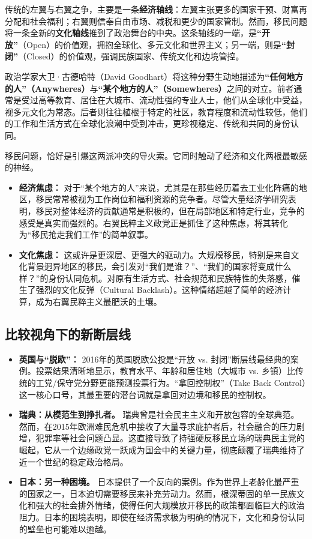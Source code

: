 \documentclass[a5paper, 11pt, openany]{ctexbook}
\begin{document}
传统的左翼与右翼之争，主要是一条\textbf{经济轴线}：左翼主张更多的国家干预、财富再分配和社会福利；右翼则信奉自由市场、减税和更少的国家管制。然而，移民问题将一条全新的\textbf{文化轴线}推到了政治舞台的中央。这条轴线的一端，是\textbf{“开放”}（Open）的价值观，拥抱全球化、多元文化和世界主义；另一端，则是\textbf{“封闭”}（Closed）的价值观，强调民族国家、传统文化和边境管控。

政治学家大卫·古德哈特（David Goodhart）将这种分野生动地描述为\textbf{“任何地方的人”（Anywheres）}与\textbf{“某个地方的人”（Somewheres）}之间的对立。前者通常是受过高等教育、居住在大城市、流动性强的专业人士，他们从全球化中受益，视多元文化为常态。后者则往往植根于特定的社区，教育程度和流动性较低，他们的工作和生活方式在全球化浪潮中受到冲击，更珍视稳定、传统和共同的身份认同。

移民问题，恰好是引爆这两派冲突的导火索。它同时触动了经济和文化两根最敏感的神经。

\begin{itemize}
    \item \textbf{经济焦虑：} 对于“某个地方的人”来说，尤其是在那些经历着去工业化阵痛的地区，移民常常被视为工作岗位和福利资源的竞争者。尽管大量经济学研究表明，移民对整体经济的贡献通常是积极的，但在局部地区和特定行业，竞争的感受是真实而强烈的。右翼民粹主义政党正是抓住了这种焦虑，将其转化为“移民抢走我们工作”的简单叙事。
    \item \textbf{文化焦虑：} 这或许是更深层、更强大的驱动力。大规模移民，特别是来自文化背景迥异地区的移民，会引发对“我们是谁？”、“我们的国家将变成什么样？”的身份认同危机。对原有生活方式、社会规范和民族特性的失落感，催生了强烈的文化反弹（Cultural Backlash）。这种情绪超越了简单的经济计算，成为右翼民粹主义最肥沃的土壤。
\end{itemize}

\subsection{比较视角下的新断层线}

\begin{itemize}
    \item \textbf{英国与“脱欧”：} 2016年的英国脱欧公投是“开放 vs. 封闭”断层线最经典的案例。投票结果清晰地显示，教育水平、年龄和居住地（大城市 vs. 乡镇）比传统的工党/保守党分野更能预测投票行为。“拿回控制权”（Take Back Control）这一核心口号，其最重要的潜台词就是拿回对边境和移民的控制权。
    \item \textbf{瑞典：从模范生到挣扎者。} 瑞典曾是社会民主主义和开放包容的全球典范。然而，在2015年欧洲难民危机中接收了大量寻求庇护者后，社会融合的压力剧增，犯罪率等社会问题凸显。这直接导致了持强硬反移民立场的瑞典民主党的崛起，它从一个边缘政党一跃成为国会中的关键力量，彻底颠覆了瑞典维持了近一个世纪的稳定政治格局。
    \item \textbf{日本：另一种困境。} 日本提供了一个反向的案例。作为世界上老龄化最严重的国家之一，日本迫切需要移民来补充劳动力。然而，根深蒂固的单一民族文化和强大的社会排外情绪，使得任何大规模放开移民的政策都面临巨大的政治阻力。日本的困境表明，即使在经济需求极为明确的情况下，文化和身份认同的壁垒也可能难以逾越。
\end{itemize}
\end{document}
